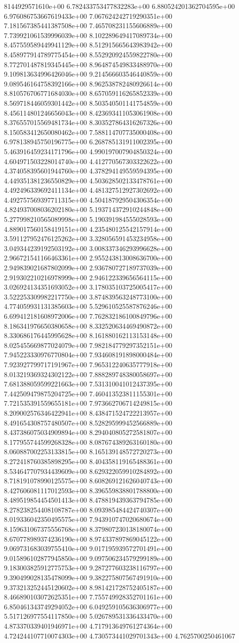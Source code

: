 8144929571610e+00	6.782433753477832283e+00	6.880524201362704595e+00	6.976086753667619433e+00	7.067624242719290351e+00	7.181567385441387508e+00	7.465708231155606889e+00	7.739921061539996039e+00	8.102289649417089734e+00	8.457559589449941129e+00	8.512915665643983942e+00	8.458977914789775454e+00	8.552920924559822780e+00	8.772701487819345445e+00	8.964874549833488970e+00	9.109813634996426046e+00	9.214566603546440859e+00	9.089546164758392166e+00	8.962538782480926614e+00	8.810576706771684030e+00	8.657059116265852339e+00	8.569718446059301442e+00	8.503540501141754859e+00	8.456114801246656043e+00	8.423693411053061908e+00	8.376557015569481734e+00	8.303527864316267326e+00	8.150583412650080462e+00	7.588114707735000408e+00	6.978138945750196775e+00	6.268785131911002395e+00	5.463916459234171796e+00	4.990197007904850324e+00	4.604971503228014740e+00	4.412770567303322622e+00	4.374058395601944760e+00	4.378294149559594395e+00	4.449351381236550829e+00	4.503628502133478761e+00	4.492496339692411134e+00	4.481327512927302692e+00	4.492757569397711315e+00	4.504187929504306354e+00	4.824937008036202180e+00	5.193714372910244848e+00	5.277998210565089998e+00	5.190391984555028593e+00	4.889017560158419151e+00	4.235480125542157914e+00	3.591127952476125262e+00	3.328056591453234958e+00	3.049344239192503192e+00	3.008337346293996628e+00	2.966721541166463361e+00	2.955243813008636700e+00	2.949839021687802099e+00	2.936780727189737039e+00	2.919302210216978999e+00	2.946122339656564115e+00	3.026924134351693052e+00	3.178035103725005417e+00	3.522253309982217750e+00	3.874839563248773100e+00	4.774059931131385603e+00	5.529610525587876246e+00	6.699412181608972006e+00	7.762832186100849796e+00	8.186341976650380658e+00	8.332520634469490872e+00	8.330686176445995628e+00	8.161880162113153148e+00	8.025455669877024079e+00	7.982184779297352151e+00	7.945223330976770804e+00	7.934608191898000484e+00	7.923927799717191967e+00	7.965312240635777918e+00	8.013219369324302122e+00	7.888289748380058697e+00	7.681388059599221663e+00	7.531310041012437395e+00	7.442509479875204725e+00	7.460413523811155301e+00	7.721535391559655181e+00	7.973662706714249815e+00	8.209002576346422941e+00	8.438471524722213957e+00	8.491654308757480507e+00	8.528295999452566889e+00	8.437386075034909894e+00	8.294040805272581807e+00	8.177955744599268328e+00	8.087674389263160180e+00	8.060887002253133815e+00	8.165139148572720273e+00	8.272418760385898295e+00	8.404358119165488361e+00	8.534647707934439609e+00	8.629322059910284892e+00	8.718191078990125575e+00	8.608269121626040743e+00	8.427606081117012593e+00	8.396559838801788800e+00	8.489519854454501413e+00	8.478819439363794785e+00	8.278238254408108787e+00	8.093985484424740307e+00	8.019336042350495575e+00	7.943910747020680674e+00	8.159631067375556768e+00	8.379807230138180074e+00	8.670778989374236190e+00	8.974337897869045122e+00	9.069731683039755410e+00	9.017195939572701491e+00	9.015896102877945850e+00	9.097506234579299189e+00	9.183003825912775753e+00	9.287277603238116797e+00	9.390499028135478099e+00	9.382275807567491910e+00	9.373213252445120602e+00	8.981421728752405187e+00	8.466890103072625351e+00	7.755749928352701161e+00	6.850461343749294052e+00	6.049259105636306977e+00	5.517126977554117850e+00	5.026789531336433470e+00	4.873370339401946971e+00	4.717913649761274364e+00	4.724244107710074303e+00	4.730573441029701343e+00	4.7625700250461067